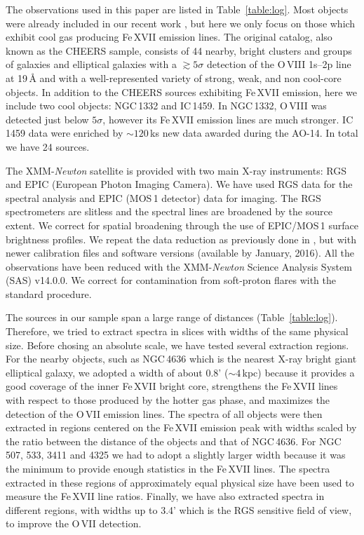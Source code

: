 \documentclass[useAMS,usenatbib]{mn2e}
\begin{document}
The observations used in this paper are listed in Table~\ref{table:log}. 
Most objects were already included in our recent work \citep{Pinto2015},
but here we only focus on those which exhibit cool gas 
producing Fe\,{\small XVII} emission lines.
The original catalog, also known as the CHEERS sample, consists of 44 nearby, 
bright clusters and groups of galaxies and elliptical galaxies
with a $\gtrsim5\sigma$ detection of the O\,{\small VIII} 1s--2p line at 19\,{\AA}
and with a well-represented variety of strong, weak, and non cool-core objects. 
In addition to the CHEERS sources exhibiting Fe\,{\small XVII} emission,
here we include two cool objects: NGC\,1332 and IC\,1459. 
In NGC\,1332, O\,{\small VIII} was detected just below $5\sigma$, 
however its Fe\,{\small XVII} emission lines are much stronger.
IC\,1459 data were enriched by $\sim120$\,ks new data awarded 
during the AO-14. In total we have 24 sources.

The XMM-\textit{Newton} satellite is provided with two main X-ray instruments: RGS and EPIC
(European Photon Imaging Camera).
We have used RGS data for the spectral analysis and EPIC (MOS\,1 detector) data for imaging.
The RGS spectrometers are slitless and the spectral lines are broadened by the source extent.
We correct for spatial broadening through the use of EPIC/MOS\,1 surface brightness profiles.
We repeat the data reduction as previously done in \citet{Pinto2015},
but with newer calibration files and software versions (available by January, 2016).
All the observations have been reduced with the 
XMM-\textit{Newton} Science Analysis System (SAS) v14.0.0.
We correct for contamination from soft-proton flares 
with the standard procedure.

The sources in our sample span a large range of distances (Table~\ref{table:log}).
Therefore, we tried to extract spectra in slices with widths of the same physical size.
Before chosing an absolute scale, we have tested several extraction regions.
For the nearby objects, such as NGC\,4636 
which is the nearest X-ray bright giant elliptical galaxy, 
we adopted a width of about 0.8' ($\sim4$\,kpc)
because it provides a good coverage of the inner Fe\,{\small XVII} bright core,
strengthens the Fe\,{\small XVII} lines with respect to those
produced by the hotter gas phase,
and maximizes the detection of the O\,{\small VII} emission lines.
The spectra of all objects were then extracted in regions centered 
on the Fe\,{\small XVII} emission peak with widths scaled 
by the ratio between the distance of the objects and that of NGC\,4636. 
For NGC 507, 533, 3411 and 4325 we had to adopt a slightly larger width because 
it was the minimum to provide enough statistics in the Fe\,{\small XVII} lines.
The spectra extracted in these regions of approximately equal physical size
have been used to measure the Fe\,{\small XVII} line ratios.
Finally, we have also extracted spectra in different regions, with widths up to 3.4' 
which is the RGS sensitive field of view, to improve the O\,{\small VII} detection.
\end{document}
